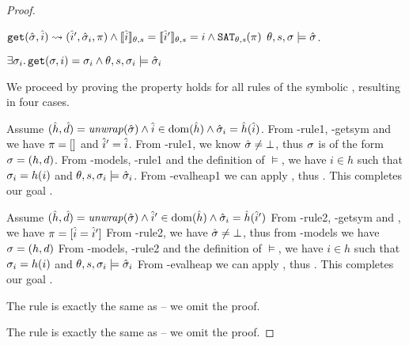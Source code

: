 \begin{proof}

\pfassume \begin{hypvlist}
 $\texttt{get}(\hat{\sigma},\hat{i})\rightsquigarrow(\hat{i}', \hat{\sigma}_i, \pi) \land \llbracket\hat{i}\rrbracket_{\theta,s}=\llbracket\hat{i}'\rrbracket_{\theta,s}=i \land \texttt{SAT}_{\mathit{\theta,s}}(\pi) $
 $\theta,s,\sigma\models\hat{\sigma}$.
\end{hypvlist}
\pfprove \begin{goalvlist}
 $\exists \sigma_i \ldotp \texttt{get}(\sigma, i)=\sigma_i \land \theta,s,\sigma_i \models \hat{\sigma}_i$
\end{goalvlist}

We proceed by proving the property holds for all rules of the symbolic , resulting in four cases.


\begin{hypvlist}
 Assume $(\hat{h}, \hat{d})={\operatorname{\mathit{unwrap}}}(\hat{\sigma}) \land \hat{i}\in\operatorname{dom}(\hat{h}) \land \hat{\sigma}_i=\hat{h}(\hat{i})$.
 From \hyp{rule1}, \hyp{getsym} and  we have $\pi=[]$ and $\hat{i}'=\hat{i}$.
 From \hyp{rule1}, we know $\hat{\sigma}\neq\bot$, thus $\sigma$ is of the form $\sigma=(h,d)$.
 From \hyp{models}, \hyp{rule1} and the definition of $\models$, we have $i\in h$ such that $\sigma_i=h(i)$ and ${\theta,s,\sigma_i\models\hat{\sigma}_i}$.
 From \hyp{evalheap1} we can apply , thus . This completes our goal .
\end{hypvlist}


\begin{hypvlist}
 Assume $(\hat{h},\hat{d})={\operatorname{\mathit{unwrap}}}(\hat{\sigma}) \land \hat{i}'\in\operatorname{dom}(\hat{h}) \land \hat{\sigma}_i=\hat{h}(\hat{i}')$
 From \hyp{rule2}, \hyp{getsym} and , we have $\pi=[\hat{i}=\hat{i}']$
 From \hyp{rule2}, we have $\hat{\sigma}\neq\bot$, thus from \hyp{models} we have $\sigma=(h, d)$
 From \hyp{models}, \hyp{rule2} and the definition of $\models$, we have $i\in h$ such that $\sigma_i=h(i)$ and ${\theta,s,\sigma_i\models\hat{\sigma}_i}$
 From \hyp{evalheap} we can apply , thus . This completes our goal .
\end{hypvlist}

The rule  is exactly the same as  -- we omit the proof.

The rule  is exactly the same as  -- we omit the proof.
\end{proof}
